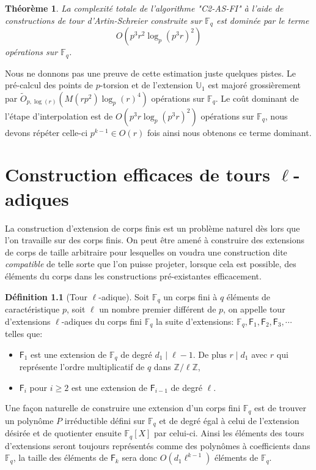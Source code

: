 \documentclass[10pt,a4paper]{book}
\theoremstyle{plain}
\newtheorem{thm}{Théorème}[chapter]
\theoremstyle{definition}
\theoremstyle{definition}
\theoremstyle{definition}
\theoremstyle{definition}
\theoremstyle{definition}
\newtheorem{defi}[thm]{Définition}
\theoremstyle{remark}
\theoremstyle{remark}
\theoremstyle{definition}
\begin{document}
\begin{thm}
\label{thm:C2:FQ}
La complexité totale de l'algorithme "C2-AS-FI" à l'aide de constructions de 
tour d'Artin-Schreier construite sur $\mathbb{F}_q$ est dominée par le terme 
\[O(p^3r^2\log_p(p^3r)^2)\]
opérations sur $\mathbb{F}_q$.
\end{thm}

Nous ne donnons pas une preuve de cette estimation juste quelques pistes. Le 
pré-calcul des points de $p$-torsion et de l'extension $\mathbb{U}_1$ est 
majoré grossièrement par $\tilde{O}_{p,\log(r)}(M(rp^2)\log_{p}(r)^4)$ 
opérations sur $\mathbb{F}_q$. 
Le coût dominant de l'étape d'interpolation est de $O(p^3r\log_p(p^3r)^2)$ 
opérations sur $\mathbb{F}_q$, nous devons répéter celle-ci $p^{k-1} \in O(r)$ 
fois ainsi nous obtenons ce terme dominant.

\chapter{Construction efficaces de tours $\ell$-adiques}
\label{cha:tour}
La construction d'extension de corps finis est un problème naturel dès lors que l'on travaille sur des corps finis. On peut être amené à construire des extensions de corps de taille arbitraire pour lesquelles on voudra une construction dite \textit{compatible} de telle sorte que l'on puisse projeter, lorsque cela est possible, des éléments du corps dans les constructions pré-existantes efficacement.

\begin{defi}[Tour \textit{$\ell$}-adique]
\label{def:tour-ell}
Soit $\mathbb{F}_q$ un corps fini à $q$ éléments de caractéristique $p$, soit $\ell$ un nombre premier différent de $p$, on appelle tour d'extensions $\ell$-adiques du corps fini $\mathbb{F}_q$ la suite d'extensions: $\mathbb{F}_q, \mathsf{F}_{1}, \mathsf{F}_{2}, \mathsf{F}_{3}, \cdots$ telles que:
\begin{itemize}
\item $\mathsf{F}_{1}$ est une extension de $\mathbb{F}_q$ de degré $d_1 \mid \ell-1$. De plus $r \mid d_1$ avec $r$ qui représente l'ordre multiplicatif de $q$ dans $\mathbb{Z}/\ell \mathbb{Z}$,
\item $\mathsf{F}_{i}$ pour $i \geqslant 2$ est une extension de $\mathsf{F}_{i-1}$ de degré $\ell$.
\end{itemize}
\end{defi}

Une façon naturelle de  construire une extension d'un corps fini $\mathbb{F}_q$ est de trouver un polynôme $P$ irréductible défini sur $\mathbb{F}_q$ et de degré égal à celui de l'extension désirée et de quotienter ensuite $\mathbb{F}_q[X]$ par celui-ci.
Ainsi les éléments des tours d'extensions seront toujours représentés comme des polynômes à coefficients dans $\mathbb{F}_q$, la taille des éléments de $\mathsf{F}_{k}$ sera donc $O(d_1\ell^{k-1})$ éléments de $\mathbb{F}_q$. 
\end{document}
